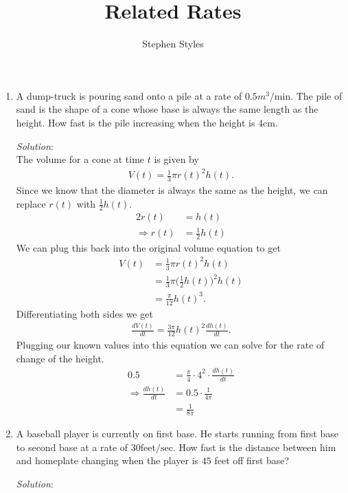 \documentclass[12pt]{article}
\title{Related Rates}
\author{Stephen Styles}
\theoremstyle{remark}
\begin{document}
\maketitle


\begin{enumerate}
\item A dump-truck is pouring sand onto a pile at a rate of $0.5m^3/\text{min}$. The pile of sand is the shape of a cone whose base is always the same length as the height. How fast is the pile increasing when the height is $4\text{cm}$.
\begin{mdframed}[style=TheoremFrame]
\textit{Solution}:\\

The volume for a cone at time $t$ is given by 
\begin{align*}
V(t) = \frac{1}{3} \pi r(t)^2 h(t).
\end{align*}
Since we know that the diameter is always the same as the height, we can replace $r(t)$ with $\frac{1}{2}h(t)$.
\begin{align*}
2r(t) &= h(t)\\
\Rightarrow r(t) &= \frac{1}{2} h(t)
\end{align*}
We can plug this back into the original volume equation to get
\begin{align*}
V(t) &= \frac{1}{3} \pi r(t)^2 h(t)\\
&= \frac{1}{3} \pi \bigg(\frac{1}{2} h(t)\bigg)^2 h(t)\\
&= \frac{\pi}{12}h(t)^3.
\end{align*}
Differentiating both sides we get
\begin{align*}
\frac{dV(t)}{dt} = \frac{3\pi}{12}h(t)^2 \frac{dh(t)}{dt}.
\end{align*}
Plugging our known values into this equation we can solve for the rate of change of the height.
\begin{align*}
0.5 &= \frac{\pi}{4} \cdot 4^2 \cdot \frac{dh(t)}{dt}\\
\Rightarrow \frac{dh(t)}{dt} &= 0.5 \cdot \frac{1}{4\pi}\\
&= \frac{1}{8\pi}
\end{align*}
\end{mdframed}
\item A baseball player is currently on first base. He starts running from first base to second base at a rate of $30\text{feet}/\text{sec}$. How fast is the distance between him and homeplate changing when the player is $45$ feet off first base?
\begin{mdframed}[style=TheoremFrame]
\textit{Solution}:\\


\end{mdframed}
\end{enumerate}
\end{document}
